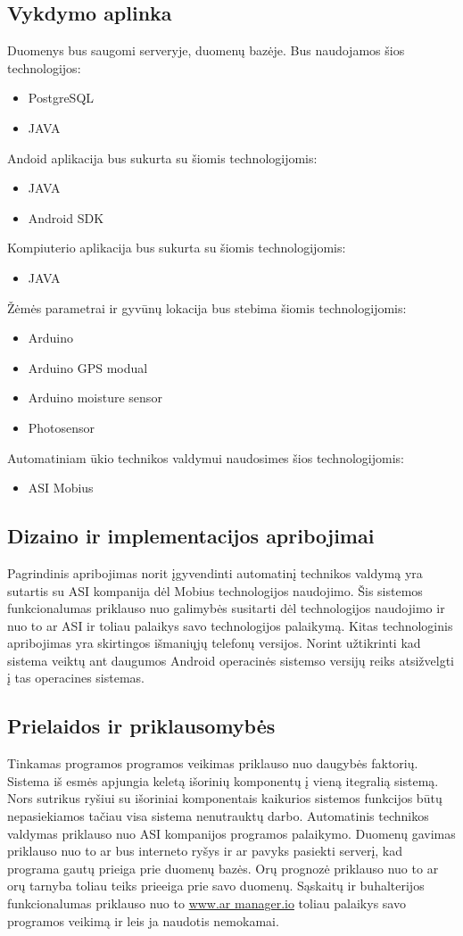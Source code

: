 \documentclass[oneside]{VUMIFPSkursinis}
\begin{document}
\subsection{Vykdymo aplinka}
Duomenys bus saugomi serveryje, duomenų bazėje. Bus naudojamos šios technologijos:
	\begin{itemize}
		\item PostgreSQL
		\item JAVA
	\end{itemize}
Andoid aplikacija bus sukurta su šiomis technologijomis:
	\begin{itemize}
		\item JAVA
		\item Android SDK
	\end{itemize}
Kompiuterio aplikacija bus sukurta su šiomis technologijomis:
	\begin{itemize}
		\item JAVA
	\end{itemize}
Žėmės parametrai ir gyvūnų lokacija bus stebima šiomis technologijomis:
	\begin{itemize}
		\item Arduino
		\item Arduino GPS modual
		\item Arduino moisture sensor
		\item Photosensor
	\end{itemize}
Automatiniam ūkio technikos valdymui naudosimes šios technologijomis:
	\begin{itemize}		
		\item ASI Mobius
	\end{itemize}
\subsection{Dizaino ir implementacijos apribojimai}
Pagrindinis apribojimas norit įgyvendinti automatinį technikos valdymą yra sutartis su ASI kompanija dėl Mobius technologijos naudojimo. Šis sistemos funkcionalumas priklauso nuo galimybės susitarti dėl technologijos naudojimo ir nuo to ar ASI ir toliau palaikys savo technologijos palaikymą. Kitas technologinis apribojimas yra skirtingos išmaniųjų telefonų versijos. Norint užtikrinti kad sistema veiktų ant daugumos Android operacinės sistemso versijų reiks atsižvelgti į tas operacines sistemas. 


\subsection{Prielaidos ir priklausomybės}
Tinkamas programos programos veikimas priklauso nuo daugybės faktorių. Sistema iš esmės apjungia keletą išorinių komponentų į vieną itegralią sistemą. Nors sutrikus ryšiui su išoriniai komponentais kaikurios sistemos funkcijos būtų nepasiekiamos tačiau visa sistema nenutrauktų darbo. Automatinis technikos valdymas priklauso nuo ASI kompanijos programos palaikymo. Duomenų gavimas priklauso nuo to ar bus interneto ryšys ir ar pavyks pasiekti serverį, kad programa gautų prieiga prie duomenų bazės. Orų prognozė priklauso nuo to ar orų tarnyba toliau teiks prieeiga prie savo duomenų. Sąskaitų ir buhalterijos funkcionalumas priklauso nuo to \url{www.ar manager.io} toliau palaikys savo programos veikimą ir leis ja naudotis nemokamai.
\end{document}

